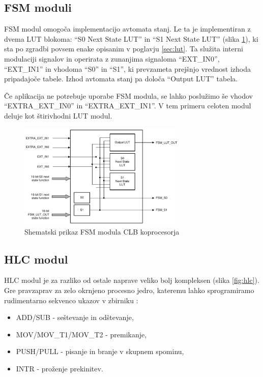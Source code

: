 \documentclass[a4paper]{article}
\begin{document}
\begin{sloppypar}
\subsection{FSM moduli}
FSM modul omogoča implementacijo avtomata stanj. Le ta je implementiran z dvema
LUT blokoma: ``S0 Next State LUT'' in ``S1 Next State
LUT'' (slika \ref{fig:fsm}), ki sta po zgradbi povsem enake opisanim v poglavju
\ref{sec:lut}. Ta služita interni modulaciji signalov in operirata z zunanjima
signaloma ``EXT\_IN0'', ``EXT\_IN1'' in vhodoma ``S0'' in ``S1'', ki prevzameta
prejšnjo vrednost izhoda pripadajoče tabele. Izhod avtomata stanj pa določa
``Output LUT'' tabela.

Če aplikacija ne potrebuje uporabe FSM modula, se lahko poslužimo še vhodov
``EXTRA\_EXT\_IN0'' in ``EXTRA\_EXT\_IN1''. V tem primeru celoten modul deluje
kot štirivhodni LUT modul.

\begin{figure}[htb]
    \centerline{\includegraphics[width=8cm]{shema_fsm}}
    \caption{Shematski prikaz FSM modula CLB koprocesorja
             \cite[Pogl.~26.4.3]{mcu-ref-manual}}
    \label{fig:fsm} 
\end{figure} 

\subsection{HLC modul}\label{sec:hlc}
HLC modul je za razliko od ostale naprave veliko bolj kompleksen (slika \ref{fig:hlc}).
Gre pravzaprav za zelo okrnjeno procesno jedro, kateremu lahko sprogramiramo
rudimentarno sekvenco ukazov v zbirniku \cite[Pogl.~26.4.6.2]{mcu-ref-manual}:
\begin{itemize}
    \item ADD/SUB - seštevanje in odštevanje,
    \item MOV/MOV\_T1/MOV\_T2 - premikanje,
    \item PUSH/PULL - pisanje in branje v skupnem spominu,
    \item INTR - proženje prekinitev.
\end{itemize}


\end{sloppypar}
\end{document}

